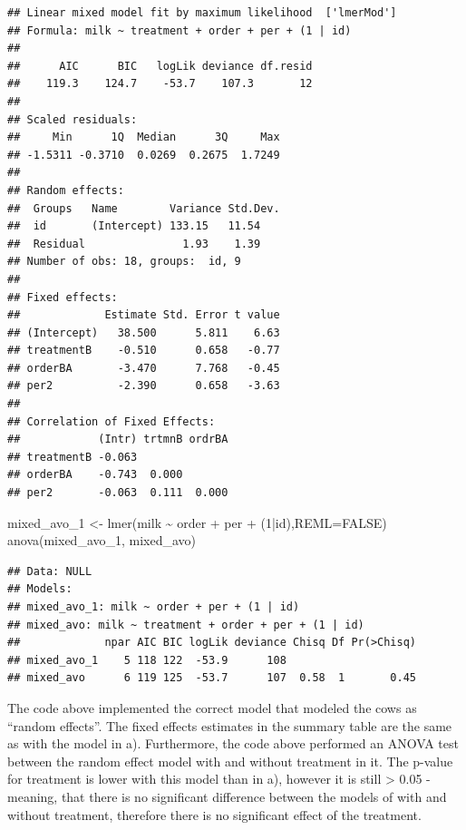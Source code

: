 \documentclass[
  10pt,
]{article}
\newenvironment{Shaded}{\begin{snugshade}}{\end{snugshade}}
\newcommand{\AttributeTok}[1]{\textcolor[rgb]{0.77,0.63,0.00}{#1}}
\newcommand{\ConstantTok}[1]{\textcolor[rgb]{0.00,0.00,0.00}{#1}}
\newcommand{\DecValTok}[1]{\textcolor[rgb]{0.00,0.00,0.81}{#1}}
\newcommand{\FunctionTok}[1]{\textcolor[rgb]{0.00,0.00,0.00}{#1}}
\newcommand{\NormalTok}[1]{#1}
\newcommand{\OtherTok}[1]{\textcolor[rgb]{0.56,0.35,0.01}{#1}}
\newcommand{\SpecialCharTok}[1]{\textcolor[rgb]{0.00,0.00,0.00}{#1}}
\begin{document}
\begin{verbatim}
## Linear mixed model fit by maximum likelihood  ['lmerMod']
## Formula: milk ~ treatment + order + per + (1 | id)
## 
##      AIC      BIC   logLik deviance df.resid 
##    119.3    124.7    -53.7    107.3       12 
## 
## Scaled residuals: 
##     Min      1Q  Median      3Q     Max 
## -1.5311 -0.3710  0.0269  0.2675  1.7249 
## 
## Random effects:
##  Groups   Name        Variance Std.Dev.
##  id       (Intercept) 133.15   11.54   
##  Residual               1.93    1.39   
## Number of obs: 18, groups:  id, 9
## 
## Fixed effects:
##             Estimate Std. Error t value
## (Intercept)   38.500      5.811    6.63
## treatmentB    -0.510      0.658   -0.77
## orderBA       -3.470      7.768   -0.45
## per2          -2.390      0.658   -3.63
## 
## Correlation of Fixed Effects:
##            (Intr) trtmnB ordrBA
## treatmentB -0.063              
## orderBA    -0.743  0.000       
## per2       -0.063  0.111  0.000
\end{verbatim}

\begin{Shaded}
\begin{Highlighting}[]
\NormalTok{mixed\_avo\_1 }\OtherTok{\textless{}{-}} \FunctionTok{lmer}\NormalTok{(milk }\SpecialCharTok{\textasciitilde{}}\NormalTok{ order }\SpecialCharTok{+}\NormalTok{ per }\SpecialCharTok{+}\NormalTok{ (}\DecValTok{1}\SpecialCharTok{|}\NormalTok{id),}\AttributeTok{REML=}\ConstantTok{FALSE}\NormalTok{)}
\FunctionTok{anova}\NormalTok{(mixed\_avo\_1, mixed\_avo)}
\end{Highlighting}
\end{Shaded}

\begin{verbatim}
## Data: NULL
## Models:
## mixed_avo_1: milk ~ order + per + (1 | id)
## mixed_avo: milk ~ treatment + order + per + (1 | id)
##             npar AIC BIC logLik deviance Chisq Df Pr(>Chisq)
## mixed_avo_1    5 118 122  -53.9      108                    
## mixed_avo      6 119 125  -53.7      107  0.58  1       0.45
\end{verbatim}

The code above implemented the correct model that modeled the cows as
``random effects''. The fixed effects estimates in the summary table are
the same as with the model in a). Furthermore, the code above performed
an ANOVA test between the random effect model with and without treatment
in it. The p-value for treatment is lower with this model than in a),
however it is still \textgreater{} 0.05 - meaning, that there is no
significant difference between the models of with and without treatment,
therefore there is no significant effect of the treatment.
\end{document}
